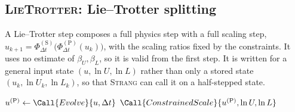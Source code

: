 \subsection{\textsc{LieTrotter}: Lie--Trotter splitting}\label{ssec:alg-lie-trotter}
A Lie--Trotter step composes a full physics step with a full scaling step,
$u_{k+1} = \Phi_{\Delta t}^{(\mathrm{S})}\bigl(\Phi_{\Delta t}^{(\mathrm{P})}(u_k)\bigr)$,
with the scaling ratios fixed by the constraints. It uses no estimate of
$\beta_U, \beta_L$, so it is valid from the first step. It is written for a
general input state $(u, \ln U, \ln L)$ rather than only a stored state
$(u_k, \ln U_k, \ln L_k)$, so that \textsc{Strang} can call it on a
half-stepped state.
\begin{algorithm}[H]
\caption{Lie--Trotter step}
\begin{algorithmic}[1]
  \State $u^{(\mathrm{P})} \gets \Call{Evolve}{u, \Delta t}$ \Comment{\S\ref{ssec:alg-substeps}}
  \State \Return $\Call{ConstrainedScale}{u^{(\mathrm{P})}, \ln U, \ln L}$ \Comment{\S\ref{ssec:alg-substeps}}
\EndFunction
\end{algorithmic}
\end{algorithm}

